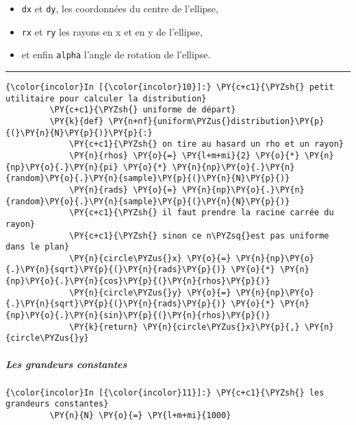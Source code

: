\begin{itemize}
\tightlist
\item
  \texttt{dx} et \texttt{dy}, les coordonnées du centre de l'ellipse,
\item
  \texttt{rx} et \texttt{ry} les rayons en x et en y de l'ellipse,
\item
  et enfin \texttt{alpha} l'angle de rotation de l'ellipse.
\end{itemize}

    \begin{center}\rule{0.5\linewidth}{\linethickness}\end{center}

    \begin{Verbatim}[commandchars=\\\{\},frame=single,framerule=0.3mm,rulecolor=\color{cellframecolor}]
{\color{incolor}In [{\color{incolor}10}]:} \PY{c+c1}{\PYZsh{} petit utilitaire pour calculer la distribution}
         \PY{c+c1}{\PYZsh{} uniforme de départ}
         \PY{k}{def} \PY{n+nf}{uniform\PYZus{}distribution}\PY{p}{(}\PY{n}{N}\PY{p}{)}\PY{p}{:}
             \PY{c+c1}{\PYZsh{} on tire au hasard un rho et un rayon}
             \PY{n}{rhos} \PY{o}{=} \PY{l+m+mi}{2} \PY{o}{*} \PY{n}{np}\PY{o}{.}\PY{n}{pi} \PY{o}{*} \PY{n}{np}\PY{o}{.}\PY{n}{random}\PY{o}{.}\PY{n}{sample}\PY{p}{(}\PY{n}{N}\PY{p}{)}
             \PY{n}{rads} \PY{o}{=} \PY{n}{np}\PY{o}{.}\PY{n}{random}\PY{o}{.}\PY{n}{sample}\PY{p}{(}\PY{n}{N}\PY{p}{)}
             \PY{c+c1}{\PYZsh{} il faut prendre la racine carrée du rayon}
             \PY{c+c1}{\PYZsh{} sinon ce n\PYZsq{}est pas uniforme dans le plan}
             \PY{n}{circle\PYZus{}x} \PY{o}{=} \PY{n}{np}\PY{o}{.}\PY{n}{sqrt}\PY{p}{(}\PY{n}{rads}\PY{p}{)} \PY{o}{*} \PY{n}{np}\PY{o}{.}\PY{n}{cos}\PY{p}{(}\PY{n}{rhos}\PY{p}{)}
             \PY{n}{circle\PYZus{}y} \PY{o}{=} \PY{n}{np}\PY{o}{.}\PY{n}{sqrt}\PY{p}{(}\PY{n}{rads}\PY{p}{)} \PY{o}{*} \PY{n}{np}\PY{o}{.}\PY{n}{sin}\PY{p}{(}\PY{n}{rhos}\PY{p}{)}
             \PY{k}{return} \PY{n}{circle\PYZus{}x}\PY{p}{,} \PY{n}{circle\PYZus{}y}
\end{Verbatim}


    \hypertarget{les-grandeurs-constantes}{%
\subparagraph{Les grandeurs constantes}\label{les-grandeurs-constantes}}

    \begin{Verbatim}[commandchars=\\\{\},frame=single,framerule=0.3mm,rulecolor=\color{cellframecolor}]
{\color{incolor}In [{\color{incolor}11}]:} \PY{c+c1}{\PYZsh{} les grandeurs constantes}
         \PY{n}{N} \PY{o}{=} \PY{l+m+mi}{1000}
\end{Verbatim}


